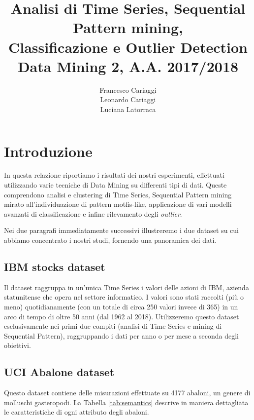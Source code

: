 \documentclass[a4paper]{article}
\title{Analisi di Time Series, Sequential Pattern mining, \\  Classificazione e Outlier Detection \\ Data Mining 2, A.A. 2017/2018}
\author{Francesco Cariaggi \\ Leonardo Cariaggi \\ Luciana Latorraca}
\begin{document}
\maketitle
\tableofcontents

\newpage

\section{Introduzione}

In questa relazione riportiamo i risultati dei nostri esperimenti, effettuati utilizzando varie tecniche di Data Mining su differenti tipi di dati. Queste comprendono analisi e clustering di Time Series, Sequential Pattern mining mirato all'individuazione di pattern motfis-like, applicazione di vari modelli avanzati di classificazione e infine rilevamento degli \textit{outlier}. 

Nei due paragrafi immediatamente successivi illustreremo i due dataset su cui abbiamo concentrato i nostri studi, fornendo una panoramica dei dati.

\subsection{IBM stocks dataset}

Il dataset raggruppa in un'unica Time Series i valori delle azioni di IBM, azienda statunitense che opera nel settore informatico. I valori sono stati raccolti (più o meno) quotidianamente (con un totale di circa 250 valori invece di 365) in un arco di tempo di oltre 50 anni (dal 1962 al 2018). Utilizzeremo questo dataset esclusivamente nei primi due compiti (analisi di Time Series e mining di Sequential Pattern), raggruppando i dati per anno o per mese a seconda degli obiettivi.

\subsection{UCI Abalone dataset}

Questo dataset contiene delle misurazioni effettuate su 4177 abaloni, un genere di molluschi gasteropodi. La Tabella \ref{tab:semantics} descrive in maniera dettagliata le caratteristiche di ogni attributo degli abaloni.
\end{document}
